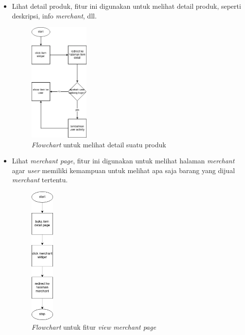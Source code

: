 \documentclass[a4paper]{article}
\begin{document}
\begin{enumerate}[label=\alph*. ]
\begin{itemize}
            \item Lihat detail produk, fitur ini digunakan untuk melihat detail produk, seperti deskripsi, info \textit{merchant}, dll.
            \begin{figure}[h]
                \centering
                \includegraphics*[height=6cm]{./diagram/flowchart/chart/open detail item.png}
                \caption{\textit{Flowchart} untuk melihat detail suatu produk}
            \end{figure}

            \item Lihat \textit{merchant page}, fitur ini digunakan untuk melihat halaman \textit{merchant} agar \textit{user} memiliki kemampuan untuk melihat apa saja barang yang dijual \textit{merchant} tertentu.
            \begin{figure}[h]
                \centering
                \includegraphics*[height=7cm]{./diagram/flowchart/chart/view merchant page.png}
                \caption{\textit{Flowchart} untuk fitur \textit{view merchant page}}
            \end{figure}
            

\end{itemize}
\end{enumerate}
\end{document}
